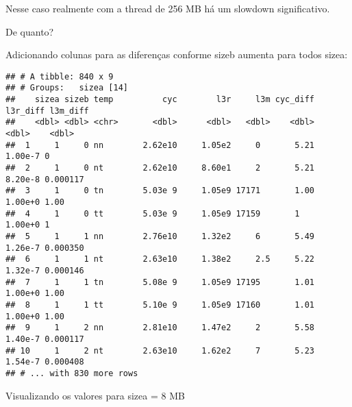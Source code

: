 \documentclass[
]{article}
\newenvironment{Shaded}{\begin{snugshade}}{\end{snugshade}}
\newcommand{\CommentTok}[1]{\textcolor[rgb]{0.56,0.35,0.01}{\textit{#1}}}
\newcommand{\DataTypeTok}[1]{\textcolor[rgb]{0.13,0.29,0.53}{#1}}
\newcommand{\DecValTok}[1]{\textcolor[rgb]{0.00,0.00,0.81}{#1}}
\newcommand{\KeywordTok}[1]{\textcolor[rgb]{0.13,0.29,0.53}{\textbf{#1}}}
\newcommand{\NormalTok}[1]{#1}
\newcommand{\OperatorTok}[1]{\textcolor[rgb]{0.81,0.36,0.00}{\textbf{#1}}}
\newcommand{\StringTok}[1]{\textcolor[rgb]{0.31,0.60,0.02}{#1}}
\begin{document}
Nesse caso realmente com a thread de 256 MB há um slowdown
significativo.

De quanto?

Adicionando colunas para as diferenças conforme sizeb aumenta para todos
sizea:

\begin{Shaded}
\end{Shaded}

\begin{verbatim}
## # A tibble: 840 x 9
## # Groups:   sizea [14]
##    sizea sizeb temp          cyc        l3r     l3m cyc_diff   l3r_diff l3m_diff
##    <dbl> <dbl> <chr>       <dbl>      <dbl>   <dbl>    <dbl>      <dbl>    <dbl>
##  1     1     0 nn        2.62e10     1.05e2     0       5.21    1.00e-7 0       
##  2     1     0 nt        2.62e10     8.60e1     2       5.21    8.20e-8 0.000117
##  3     1     0 tn        5.03e 9     1.05e9 17171       1.00    1.00e+0 1.00    
##  4     1     0 tt        5.03e 9     1.05e9 17159       1       1.00e+0 1       
##  5     1     1 nn        2.76e10     1.32e2     6       5.49    1.26e-7 0.000350
##  6     1     1 nt        2.63e10     1.38e2     2.5     5.22    1.32e-7 0.000146
##  7     1     1 tn        5.08e 9     1.05e9 17195       1.01    1.00e+0 1.00    
##  8     1     1 tt        5.10e 9     1.05e9 17160       1.01    1.00e+0 1.00    
##  9     1     2 nn        2.81e10     1.47e2     2       5.58    1.40e-7 0.000117
## 10     1     2 nt        2.63e10     1.62e2     7       5.23    1.54e-7 0.000408
## # ... with 830 more rows
\end{verbatim}

Visualizando os valores para sizea = 8 MB
\end{document}
